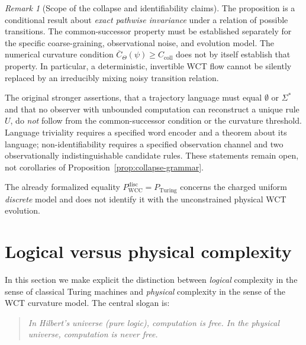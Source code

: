 \documentclass[12pt]{article}
\theoremstyle{remark}
\newtheorem*{remark}{Remark}
\begin{document}
\begin{remark}[Scope of the collapse and identifiability claims]
\label{rem:infinite-compute}
The proposition is a conditional result about \emph{exact pathwise
invariance} under a relation of possible transitions. The
common-successor property must be established separately for the
specific coarse-graining, observational noise, and evolution model.
The numerical curvature condition
$\overline C_\Theta(\psi)\ge C_{\mathrm{coll}}$ does not by itself
establish that property. In particular, a deterministic, invertible
WCT flow cannot be silently replaced by an irreducibly mixing noisy
transition relation.

The original stronger assertions, that a trajectory language must
equal $\emptyset$ or $\Sigma^\ast$ and that no observer with unbounded
computation can reconstruct a unique rule $U$, do \emph{not} follow
from the common-successor condition or the curvature threshold.
Language triviality requires a specified word encoder and a theorem
about its language; non-identifiability requires a specified observation
channel and two observationally indistinguishable candidate rules.
These statements remain open, not corollaries of
Proposition~\ref{prop:collapse-grammar}.

The already formalized equality
$P_{\mathrm{WCC}}^{\mathrm{disc}}=P_{\mathrm{Turing}}$
concerns the charged uniform \emph{discrete} model and does not
identify it with the unconstrained physical WCT evolution.
\end{remark}





\clearpage

\section{Logical versus physical complexity}
\label{sec:logical-physical-complexity}

In this section we make explicit the distinction between
\emph{logical} complexity in the sense of classical Turing machines
and \emph{physical} complexity in the sense of the WCT curvature
model. The central slogan is:

\begin{quote}
\emph{In Hilbert's universe (pure logic), computation is free. In the
physical universe, computation is never free.}
\end{quote}
\end{document}
